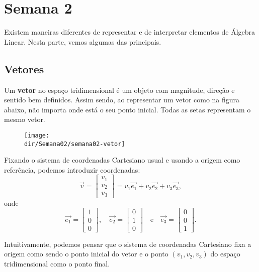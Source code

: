 \documentclass[../livro.tex]{subfiles}  %
\providecommand{\dir}{..}
\begin{document}
\chapter{Semana 2}

\vspace{0.5cm}

Existem maneiras diferentes de representar e de interpretar elementos de Álgebra Linear. Nesta parte, vemos algumas das principais.


\section{Vetores}

Um \textbf{vetor} no espaço tridimensional é um objeto com magnitude, direção e sentido bem definidos. Assim sendo, ao representar um vetor como na figura abaixo, não importa onde está o seu ponto inicial. Todas as setas representam o mesmo vetor.

\begin{figure}[h!]
\begin{center}
\texttt{[image: \\dir/Semana02/semana02-vetor]}
\end{center}
\end{figure}

Fixando o sistema de coordenadas Cartesiano usual e usando a origem como referência, podemos introduzir coordenadas:
\[
\vec{v} =
\left[
  \begin{array}{c}
    v_1 \\
    v_2 \\
    v_3
  \end{array}
\right]
= v_1 \vec{e_1} + v_2 \vec{e_2} + v_3 \vec{e_3},
\] onde
\[
\vec{e_1} =
\left[
  \begin{array}{c}
    1 \\
    0 \\
    0
  \end{array}
\right], \quad
\vec{e_2} =
\left[
  \begin{array}{c}
    0 \\
    1 \\
    0
  \end{array}
\right] \quad  \text{e} \quad
\vec{e_3} =
\left[
  \begin{array}{c}
    0 \\
    0 \\
    1
  \end{array}
\right].
\] 


\noindent Intuitivamente, podemos pensar que o sistema de coordenadas Cartesiano fixa a origem como sendo o ponto inicial do vetor e o ponto $(v_1, v_2, v_3)$ do espaço tridimensional como o ponto final. 
\end{document}
